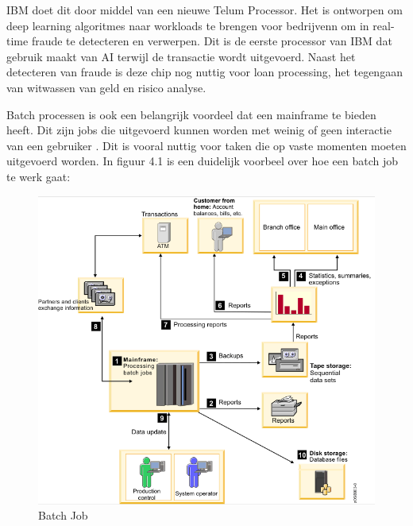 IBM doet dit door middel van een nieuwe Telum Processor. Het is ontworpen om deep learning algoritmes naar workloads te brengen voor bedrijvenn om in real-time fraude te detecteren en verwerpen. Dit is de eerste processor van IBM dat gebruik maakt van AI terwijl de transactie wordt uitgevoerd. Naast het detecteren van fraude is deze chip nog nuttig voor loan processing, het tegengaan van witwassen van geld en risico analyse. \autocite{IBM2021a}

Batch processen is ook een belangrijk voordeel dat een mainframe te bieden heeft. Dit zijn jobs die uitgevoerd kunnen worden met weinig of geen interactie van een gebruiker \autocite{IBM}. Dit is vooral nuttig voor taken die op vaste momenten moeten uitgevoerd worden. In figuur 4.1 is een duidelijk voorbeel over hoe een batch job te werk gaat:

\begin{figure}[pt!]
    \centering
    \includegraphics[width=400pt]{./graphics/BatchJobVB.png}
    \caption{Batch Job \autocite{IBMb}}
    \label{fig}
\end{figure}

